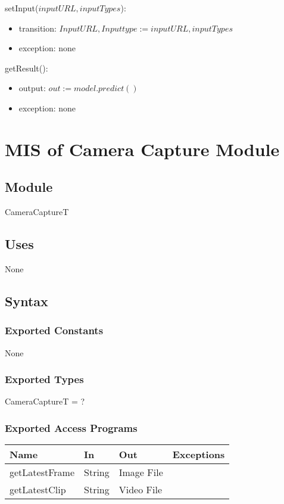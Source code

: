 \documentclass[12pt, titlepage]{article}
\begin{document}
\noindent setInput($inputURL, inputTypes$):
\begin{itemize}
\item transition: $ InputURL, Inputtype := inputURL,inputTypes$
\item exception: none
\end{itemize}

\noindent getResult():
\begin{itemize}
    \item output: $out := model.predict()$
    \item exception: none
\end{itemize}

\newpage

\section{MIS of Camera Capture Module}
\label{cameraCapture:Module}

\subsection{Module}

CameraCaptureT

\subsection{Uses}
None

\subsection{Syntax}

\subsubsection{Exported Constants}
None

\subsubsection{Exported Types}
CameraCaptureT = ?

\subsubsection{Exported Access Programs}

\begin{tabular}{l l l l}
\hline
\textbf{Name} & \textbf{In} & \textbf{Out} & \textbf{Exceptions} \\
\hline
getLatestFrame & String & Image File & \\
getLatestClip & String & Video File & \\
\hline
\end{tabular}
\end{document}
